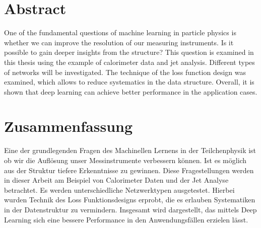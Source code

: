 \chapter*{Abstract}

One of the fundamental questions of machine learning in particle
physics is whether we can improve the resolution of our measuring
instruments. Is it possible to gain deeper insights from the
structure? This question is examined in this thesis using the example
of calorimeter data and jet analysis. Different types of networks will
be investigated. The technique of the loss function design was
examined, which allows to reduce systematics in the data
structure. Overall, it is shown that deep learning can achieve better
performance in the application cases.

\chapter*{Zusammenfassung}
Eine der grundlegenden Fragen des Machinellen Lernens in der
Teilchenphysik ist ob wir die Auflösung unser Messinstrumente
verbessern können. Ist es möglich aus der Struktur tiefere
Erkenntnisse zu gewinnen. Diese Fragestellungen werden in dieser
Arbeit am Beispiel von Calorimeter Daten und der Jet Analyse
betrachtet. Es werden unterschiedliche Netzwerktypen
ausgetestet. Hierbei wurden Technik des Loss Funktionsdesigns erprobt,
die es erlauben Systematiken in der Datenstruktur zu
vermindern. Insgesamt wird dargestellt, das mittels Deep Learning sich
eine bessere Performance in den Anwendungsfällen erzielen lässt.
